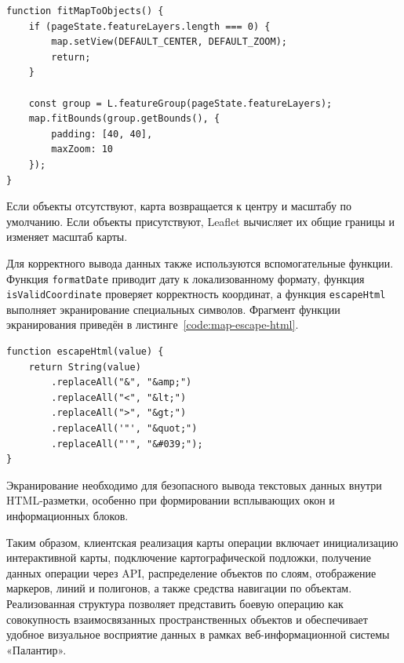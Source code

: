 \begin{code}
\label{code:map-fit-objects}
\vspace{-0.75cm}
\begin{verbatim}
function fitMapToObjects() {
    if (pageState.featureLayers.length === 0) {
        map.setView(DEFAULT_CENTER, DEFAULT_ZOOM);
        return;
    }

    const group = L.featureGroup(pageState.featureLayers);
    map.fitBounds(group.getBounds(), {
        padding: [40, 40],
        maxZoom: 10
    });
}
\end{verbatim}
\end{code}

Если объекты отсутствуют, карта возвращается к центру и масштабу по умолчанию. Если объекты присутствуют, Leaflet вычисляет их общие границы и изменяет масштаб карты.

Для корректного вывода данных также используются вспомогательные функции. Функция \texttt{formatDate} приводит дату к локализованному формату, функция \texttt{isValidCoordinate} проверяет корректность координат, а функция \texttt{escapeHtml} выполняет экранирование специальных символов. Фрагмент функции экранирования приведён в листинге~\ref{code:map-escape-html}.

\begin{code}
\label{code:map-escape-html}
\vspace{-0.75cm}
\begin{verbatim}
function escapeHtml(value) {
    return String(value)
        .replaceAll("&", "&amp;")
        .replaceAll("<", "&lt;")
        .replaceAll(">", "&gt;")
        .replaceAll('"', "&quot;")
        .replaceAll("'", "&#039;");
}
\end{verbatim}
\end{code}

Экранирование необходимо для безопасного вывода текстовых данных внутри HTML-разметки, особенно при формировании всплывающих окон и информационных блоков.

Таким образом, клиентская реализация карты операции включает инициализацию интерактивной карты, подключение картографической подложки, получение данных операции через API, распределение объектов по слоям, отображение маркеров, линий и полигонов, а также средства навигации по объектам. Реализованная структура позволяет представить боевую операцию как совокупность взаимосвязанных пространственных объектов и обеспечивает удобное визуальное восприятие данных в рамках веб-информационной системы «Палантир».

